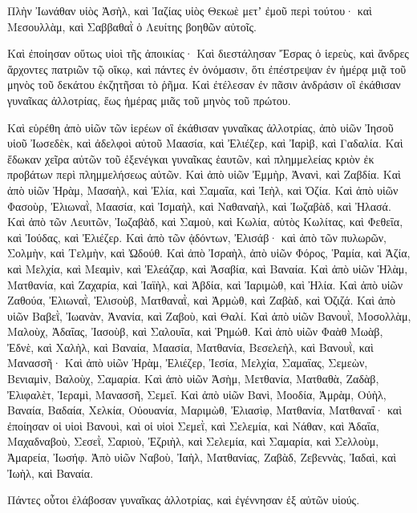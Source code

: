 {Πλὴν Ἰωνάθαν υἱὸς Ἀσὴλ, καὶ Ἰαζίας υἱὸς Θεκωὲ μετʼ ἐμοῦ περὶ τούτου· καὶ Μεσουλλὰμ, καὶ Σαββαθαῒ ὁ Λευίτης βοηθῶν αὐτοῖς.
\par }{\PP {}Καὶ ἐποίησαν οὕτως υἱοὶ τῆς ἀποικίας· Καὶ διεστάλησαν Ἔσρας ὁ ἱερεὺς, καὶ ἄνδρες ἄρχοντες πατριῶν τῷ οἴκῳ, καὶ πάντες ἐν ὀνόμασιν, ὅτι ἐπέστρεψαν ἐν ἡμέρᾳ μιᾷ τοῦ μηνὸς τοῦ δεκάτου ἐκζητῆσαι τὸ ῥῆμα.
Καὶ ἐτέλεσαν ἐν πᾶσιν ἀνδράσιν οἳ ἐκάθισαν γυναῖκας ἀλλοτρίας, ἕως ἡμέρας μιᾶς τοῦ μηνὸς τοῦ πρώτου.
\par }{\PP {}Καὶ εὑρέθη ἀπὸ υἱῶν τῶν ἱερέων οἳ ἐκάθισαν γυναῖκας ἀλλοτρίας, ἀπὸ υἱῶν Ἰησοῦ υἱοῦ Ἰωσεδὲκ, καὶ ἀδελφοὶ αὐτοῦ Μαασία, καὶ Ἐλιέζερ, καὶ Ἰαρὶβ, καὶ Γαδαλία.
Καὶ ἔδωκαν χεῖρα αὐτῶν τοῦ ἐξενέγκαι γυναῖκας ἑαυτῶν, καὶ πλημμελείας κριὸν ἐκ προβάτων περὶ πλημμελήσεως αὐτῶν.
Καὶ ἀπὸ υἱῶν Ἐμμὴρ, Ἀνανὶ, καὶ Ζαβδία.
Καὶ ἀπὸ υἱῶν Ἠρὰμ, Μασαὴλ, καὶ Ἐλία, καὶ Σαμαΐα, καὶ Ἰεὴλ, καὶ Ὀζία.
Καὶ ἀπὸ υἱῶν Φασοὺρ, Ἐλιωναῒ, Μαασία, καὶ Ἰσμαὴλ, καὶ Ναθαναὴλ, καὶ Ἰωζαβὰδ, καὶ Ἠλασά.
Καὶ ἀπὸ τῶν Λευιτῶν, Ἰωζαβὰδ, καὶ Σαμοὺ, καὶ Κωλία, αὐτὸς Κωλίτας, καὶ Φεθεΐα, καὶ Ἰούδας, καὶ Ἐλιέζερ.
Καὶ ἀπὸ τῶν ᾀδόντων, Ἐλισάβ· καὶ ἀπὸ τῶν πυλωρῶν, Σολμὴν, καὶ Τελμὴν, καὶ Ὠδούθ.
Καὶ ἀπὸ Ἰσραὴλ, ἀπὸ υἱῶν Φόρος, Ῥαμία, καὶ Ἀζία, καὶ Μελχία, καὶ Μεαμὶν, καὶ Ἐλεάζαρ, καὶ Ἀσαβία, καὶ Βαναία.
Καὶ ἀπὸ υἱῶν Ἡλὰμ, Ματθανία, καὶ Ζαχαρία, καὶ Ἰαϊὴλ, καὶ Ἀβδία, καὶ Ἰαριμὼθ, καὶ Ἠλία.
Καὶ ἀπὸ υἱῶν Ζαθούα, Ἐλιωναῒ, Ἐλισοὺβ, Ματθαναῒ, καὶ Ἀρμὼθ, καὶ Ζαβὰδ, καὶ Ὀζιζά.
Καὶ ἀπὸ υἱῶν Βαβεῒ, Ἰωανὰν, Ἀνανία, καὶ Ζαβοὺ, καὶ Θαλί.
Καὶ ἀπὸ υἱῶν Βανουῒ, Μοσολλὰμ, Μαλοὺχ, Ἀδαΐας, Ἰασοὺβ, καὶ Σαλουΐα, καὶ Ῥημώθ.
Καὶ ἀπὸ υἱῶν Φαὰθ Μωὰβ, Ἐδνὲ, καὶ Χαλὴλ, καὶ Βαναία, Μαασία, Ματθανία, Βεσελεὴλ, καὶ Βανουῒ, καὶ Μανασσῆ·
Καὶ ἀπὸ υἱῶν Ἠρὰμ, Ἐλιέζερ, Ἰεσία, Μελχία, Σαμαΐας, Σεμεὼν,
Βενιαμὶν, Βαλοὺχ, Σαμαρία.
Καὶ ἀπὸ υἱῶν Ἀσὴμ, Μετθανία, Ματθαθὰ, Ζαδὰβ, Ἐλιφαλὲτ, Ἱεραμὶ, Μανασσῆ, Σεμεΐ.
Καὶ ἀπὸ υἱῶν Βανὶ, Μοοδία, Ἀμρὰμ, Οὐὴλ,
Βαναία, Βαδαία, Χελκία,
Οὐουανία, Μαριμὼθ, Ἐλιασὶφ,
Ματθανία, Ματθαναΐ· καὶ ἐποίησαν
οἱ υἱοὶ Βανουὶ, καὶ οἱ υἱοὶ Σεμεῒ,
καὶ Σελεμία, καὶ Νάθαν, καὶ Ἀδαΐα,
Μαχαδναβοὺ, Σεσεῒ, Σαριοὺ,
Ἐζριὴλ, καὶ Σελεμία, καὶ Σαμαρία,
καὶ Σελλοὺμ, Ἀμαρεία, Ἰωσήφ.
Ἀπὸ υἱῶν Ναβοὺ, Ἰαὴλ, Ματθανίας, Ζαβὰδ, Ζεβεννὰς, Ἰαδαὶ, καὶ Ἰωὴλ, καὶ Βαναία.
\par }{\PP {}Πάντες οὗτοι ἐλάβοσαν γυναῖκας ἀλλοτρίας, καὶ ἐγέννησαν ἐξ αὐτῶν υἱούς.
\par }